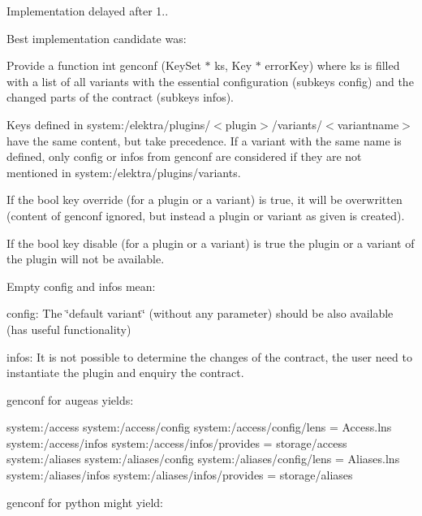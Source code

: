 Implementation delayed after 1..

Best implementation candidate was\+:


\begin{DoxyEnumerate}
\item Provide a function {\ttfamily int genconf (Key\+Set $\ast$ ks, Key $\ast$ error\+Key)} where {\ttfamily ks} is filled with a list of all variants with the essential configuration (subkeys {\ttfamily config}) and the changed parts of the contract (subkeys {\ttfamily infos}).
\item Keys defined in {\ttfamily system\+:/elektra/plugins/$<$plugin$>$/variants/$<$variantname$>$} have the same content, but take precedence. If a variant with the same name is defined, only {\ttfamily config} or {\ttfamily infos} from {\ttfamily genconf} are considered if they are not mentioned in {\ttfamily system\+:/elektra/plugins/variants}.
\item If the bool key {\ttfamily override} (for a plugin or a variant) is true, it will be overwritten (content of {\ttfamily genconf} ignored, but instead a plugin or variant as given is created).
\item If the bool key {\ttfamily disable} (for a plugin or a variant) is true the plugin or a variant of the plugin will not be available.
\item Empty {\ttfamily config} and {\ttfamily infos} mean\+:
\begin{DoxyItemize}
\item {\ttfamily config}\+: The \char`\"{}default variant\char`\"{} (without any parameter) should be also available (has useful functionality)
\item {\ttfamily infos}\+: It is not possible to determine the changes of the contract, the user need to instantiate the plugin and enquiry the contract.
\end{DoxyItemize}
\end{DoxyEnumerate}

{\ttfamily genconf} for augeas yields\+:


\begin{DoxyCode}
system:/access
system:/access/config
system:/access/config/lens = Access.lns
system:/access/infos
system:/access/infos/provides = storage/access
system:/aliases
system:/aliases/config
system:/aliases/config/lens = Aliases.lns
system:/aliases/infos
system:/aliases/infos/provides = storage/aliases
\end{DoxyCode}


{\ttfamily genconf} for python might yield\+:



